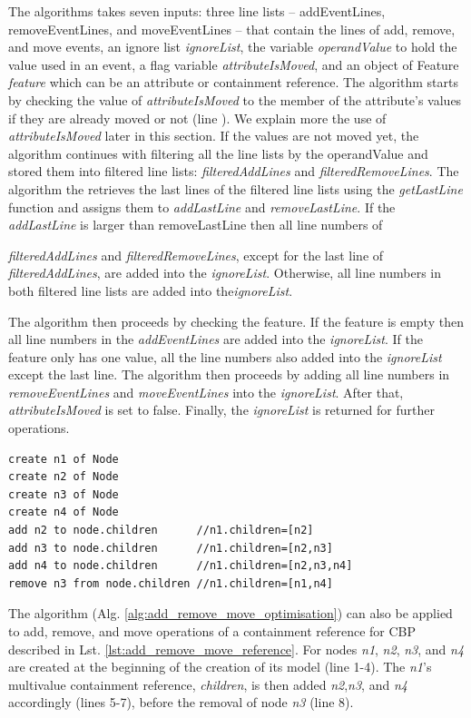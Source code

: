 \documentclass{llncs}
\begin{document}
The algorithms takes seven inputs: three line lists -- addEventLines, removeEventLines, and moveEventLines -- that contain the lines of add, remove, and move events, an ignore list \emph{ignoreList}, the variable \emph{operandValue} to hold the value used in an event, a flag variable \emph{attributeIsMoved}, and an object of Feature \emph{feature} which can be an attribute or containment reference. The algorithm starts by checking the value of \emph{attributeIsMoved} to the member of the attribute's values if they are already moved or not (line ). We explain more the use of \emph{attributeIsMoved} later in this section. If the values are not moved yet, the algorithm continues with filtering all the line lists by the operandValue and stored them into filtered line lists: \emph{filteredAddLines} and \emph{filteredRemoveLines}. The algorithm the retrieves the last lines of the filtered line lists using the \emph{getLastLine} function and assigns them to \emph{addLastLine} and \emph{removeLastLine}. If the \emph{addLastLine} is larger than {removeLastLine} then all line numbers of {\emph{filteredAddLines} and \emph{filteredRemoveLines}, except for the last line of \emph{filteredAddLines}, are added into the \emph{ignoreList}. Otherwise, all line numbers in both filtered line lists are added into the\emph{ignoreList}.

The algorithm then proceeds by checking the feature. If the feature is empty then all line numbers in the \emph{addEventLines} are added into the \emph{ignoreList}. If the feature only has one value, all the line numbers also added into the \emph{ignoreList} except the last line. The algorithm then proceeds by adding all line numbers in \emph{removeEventLines} and \emph{moveEventLines} into the \emph{ignoreList}. After that, \emph{attributeIsMoved} is set to false. Finally, the \emph{ignoreList} is returned for further operations.    

\begin{lstlisting}[style=eol,caption={Example of CBP representation of attribute \emph{values}'s add and remove operations.},label=lst:add_remove_move_reference]
create n1 of Node
create n2 of Node
create n3 of Node
create n4 of Node
add n2 to node.children      //n1.children=[n2] 
add n3 to node.children      //n1.children=[n2,n3] 
add n4 to node.children      //n1.children=[n2,n3,n4] 
remove n3 from node.children //n1.children=[n1,n4] 
\end{lstlisting}

The algorithm (Alg. \ref{alg:add_remove_move_optimisation}) can also be applied to add, remove, and move operations of a containment reference for CBP described in Lst. \ref{lst:add_remove_move_reference}. For nodes \emph{n1}, \emph{n2}, \emph{n3}, and \emph{n4} are created at the beginning of the creation of its model (line 1-4). The \emph{n1}'s multivalue containment reference, \emph{children}, is then added \emph{n2},\emph{n3}, and \emph{n4} accordingly (lines 5-7), before the removal of node \emph{n3} (line 8). 

}
\end{document}
